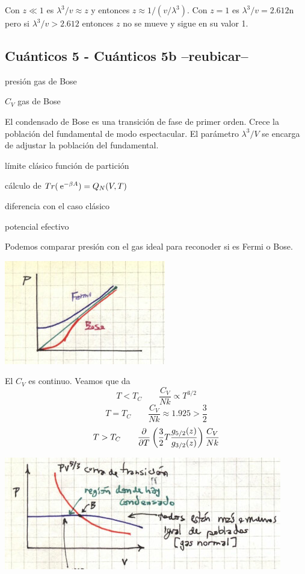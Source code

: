 \documentclass[10pt,oneside]{CBFT_book}
\begin{document}
Con $ z \ll 1$ es $ \lambda^3 / v \approx z $ y entonces $ z \approx 1/ (v/\lambda^3) $.
Con $ z=1 $ es $ \lambda^3 / v = 2.612$n pero si $ \lambda^3 / v > 2.612 $ entonces $z$ no se mueve y
sigue en su valor 1.


\subsection{Cuánticos 5 - Cuánticos 5b --reubicar--}

presión gas de Bose

$C_V$ gas de Bose

El condensado de Bose es una transición de fase de primer orden.
Crece la población del fundamental de modo espectacular. El parámetro $ \lambda^3/V $ se encarga de
adjustar la población del fundamental.

límite clásico función de partición

cálculo de $ Tr (\:\mathrm{e}^{-\beta A} ) = Q_N(V,T) $

diferencia con el caso clásico

potencial efectivo


Podemos comparar presión con el gas ideal para reconoder si es Fermi o Bose.

\includegraphics[scale=0.5]{images/1606329551.jpg}


El $C_V$ es continuo. Veamos que da
\[
	T<T_C \qquad \frac{C_V}{Nk} \propto T^{3/2}
\]
\[
	T=T_C \qquad \frac{C_V}{Nk} \approx 1.925 > \frac 3 2
\]
\[
	T>T_C \qquad \frac{\partial^{\hspace{-0.05em}} {}}{\partial {T}^{\hspace{-0.05em}}}\left( \frac{3}{2} T \frac{g_{5/2}(z)}{g_{3/2}(z)} \right) \frac{C_V}{Nk} 
\]


\includegraphics[scale=0.5]{images/1606329555.jpg}
\end{document}
